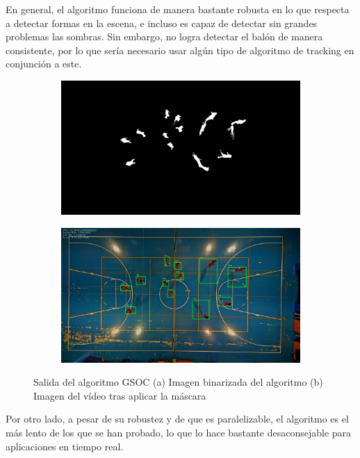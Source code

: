 En general, el algoritmo funciona de manera bastante robusta en lo que respecta a detectar formas en la escena, e incluso es capaz de detectar sin grandes problemas las sombras. Sin embargo, no logra detectar el balón de manera consistente, por lo que sería necesario usar algún tipo de algoritmo de tracking en conjunción a este.

\begin{figure}
\begin{subfigure}{.5\textwidth}
  \centering
  \includegraphics[width=.9\linewidth]{images/GSOCsub}
  \caption { }
  \label{fig:GSOC1a}
\end{subfigure}%
\begin{subfigure}{.5\textwidth}
  \centering
  \includegraphics[width=.9\linewidth]{images/GSOC}
  \caption { }
  \label{fig:GSOC1b}
\end{subfigure}
\caption{Salida del algoritmo GSOC (a) Imagen binarizada del algoritmo (b) Imagen del vídeo tras aplicar la máscara }
\label{fig:GSOC}
\end{figure}

Por otro lado, a pesar de su robustez y de que es paralelizable, el algoritmo es el más lento de los que se han probado, lo que lo hace bastante desaconsejable para aplicaciones en tiempo real.

